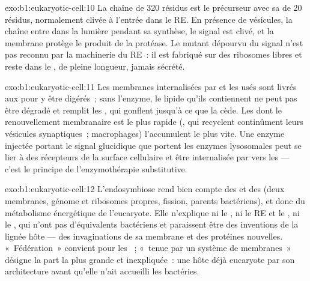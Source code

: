 \begin{solution}{exo:b1:eukaryotic-cell:10}
La chaîne de \qty{320}{} résidus est le précurseur avec sa  de \qty{20}{} résidus, normalement clivée à l'entrée dans le RE.
En présence de vésicules, la chaîne entre dans la lumière pendant sa
synthèse, le signal est clivé, et la membrane protège le produit de la
protéase. Le mutant dépourvu du signal n'est pas reconnu par la
machinerie du RE~: il est fabriqué sur des ribosomes libres et reste
dans le , de pleine longueur, jamais sécrété.
\end{solution}

\begin{solution}{exo:b1:eukaryotic-cell:11}
Les membranes internalisées par  et les  usés sont
livrés aux  pour y être digérés~; sans l'enzyme, le lipide
qu'ils contiennent ne peut pas être dégradé et remplit les ,
qui gonflent jusqu'à ce que la  cède. Les  dont le
renouvellement membranaire est le plus rapide (, qui recyclent
continûment leurs vésicules synaptiques~; macrophages) l'accumulent le
plus vite. Une enzyme injectée portant le signal glucidique que portent
les enzymes lysosomales peut se lier à des récepteurs de la surface
cellulaire et être internalisée par  vers les  ---
c'est le principe de l'enzymothérapie substitutive.
\end{solution}

\begin{solution}{exo:b1:eukaryotic-cell:12}
L'endosymbiose rend bien compte des  et des  (deux
membranes, génome et ribosomes propres, fission, parents bactériens), et
donc du métabolisme énergétique de l'eucaryote. Elle n'explique ni le
, ni le RE et le , ni le , qui n'ont pas
d'équivalents bactériens et paraissent être des inventions de la lignée
hôte --- des invaginations de sa membrane et des protéines nouvelles.
«~Fédération~» convient pour les ~; «~tenue par un système de
membranes~» désigne la part la plus grande et inexpliquée~: une 
hôte déjà eucaryote par son architecture avant qu'elle n'ait accueilli
les bactéries.
\end{solution}

